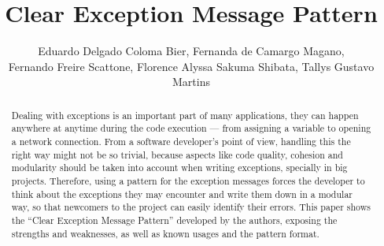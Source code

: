 \documentclass[12pt]{article}
\title{Clear Exception Message Pattern}
\author{Eduardo Delgado Coloma Bier\inst{1}, Fernanda de Camargo Magano\inst{1}, \\ Fernando Freire Scattone\inst{1},
  Florence Alyssa Sakuma Shibata\inst{1}, Tallys Gustavo Martins\inst{1} }
\begin{document}
 

\maketitle

\begin{abstract}

 
 Dealing with exceptions is an important part of many applications, they can happen anywhere at anytime during the code execution --- from assigning a variable to opening a network connection. From a software developer's point of view, handling this the right way might not be so trivial, because aspects like code quality, cohesion and modularity should be taken into account when writing exceptions, specially in big projects. Therefore, using a pattern for the exception messages forces the developer to think about the exceptions they may encounter and write them down in a modular way, so that newcomers to the project can easily identify their errors. This paper shows the ``Clear Exception Message Pattern'' developed by the authors, exposing the strengths and weaknesses, as well as known usages and the pattern format.
 

  
\end{abstract}
\end{document}
